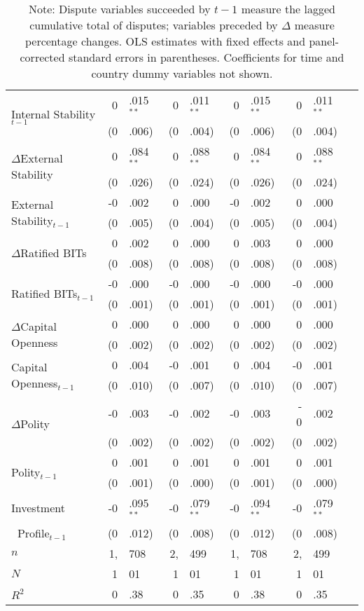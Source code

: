 \documentclass[12pt,onesided]{amsart}
\begin{document}
\begin{table}[ht]
{\begin{tabular}{lr@{} lr@{}lr@{}lr@{}lr@{}}
  \multirow{2}{*}{Internal Stability$_{t-1}$} & 0&.015$^{\ast\ast}$ &  0&.011$^{\ast\ast}$ &  0&.015$^{\ast\ast}$ &  0&.011$^{\ast\ast}$ \\
  & (0&.006) &  (0&.004) &  (0&.006) &  (0&.004) \\
  \multirow{2}{*}{$\Delta$External Stability} & 0&.084$^{\ast\ast}$ & 0&.088$^{\ast\ast}$ &  0&.084$^{\ast\ast}$ &  0&.088$^{\ast\ast}$ \\
  & (0&.026) &  (0&.024) &  (0&.026) &  (0&.024) \\
  \multirow{2}{*}{External Stability$_{t-1}$} & -0&.002 &  0&.000 &  -0&.002 &  0&.000 \\
  & (0&.005) &  (0&.004) &  (0&.005) &  (0&.004) \\
  \multirow{2}{*}{$\Delta$Ratified BITs} & 0&.002 &  0&.000 &  0&.003 &  0&.000 \\
  & (0&.008) &  (0&.008) &  (0&.008) &  (0&.008) \\
  \multirow{2}{*}{Ratified BITs$_{t-1}$} & -0&.000 & -0&.000 &  -0&.000 & -0&.000 \\
  & (0&.001) & (0&.001) &  (0&.001) &  (0&.001) \\
  \multirow{2}{*}{$\Delta$Capital Openness} & 0&.000 & 0&.000 &  0&.000 &  0&.000 \\
  & (0&.002) &  (0&.002) &  (0&.002) &  (0&.002) \\
  \multirow{2}{*}{Capital Openness$_{t-1}$} & 0&.004 & -0&.001 &  0&.004 &  -0&.001 \\
  & (0&.010) & (0&.007) & (0&.010) & (0&.007) \\
  \multirow{2}{*}{$\Delta$Polity} & -0&.003 & -0&.002 &  -0&.003 & - 0&.002  \\
  & (0&.002) & (0&.002) &  (0&.002) &  (0&.002) \\
  \multirow{2}{*}{Polity$_{t-1}$} & 0&.001 & 0&.001 &  0&.001 &  0&.001 \\
  & (0&.001) & (0&.000) &  (0&.001) &  (0&.000) \\
    Investment & -0&.095$^{\ast\ast}$ & -0&.079$^{\ast\ast}$ & -0&.094$^{\ast\ast}$ & -0&.079$^{\ast\ast}$ \\
  $\;\;$Profile$_{t-1}$ & (0&.012) & (0&.008) & (0&.012) & (0&.008) \\
	\hline
	$n$ & 1,&708 & 2,&499 & 1,&708 & 2,&499 \\
	$N$ & 1&01 & 1&01 & 1&01 & 1&01 \\
	$R^{2}$ & 0&.38 & 0&.35 & 0&.38 & 0&.35 \\
	\hline\hline
\end{tabular}
\caption*{Note: Dispute variables succeeded by ${t-1}$ measure the lagged cumulative total of disputes; variables preceded by $\Delta$ measure percentage changes. OLS estimates with fixed effects and panel-corrected standard errors in parentheses. Coefficients for time and country dummy variables not shown.}
}
\end{table}
\FloatBarrier
\end{document}
